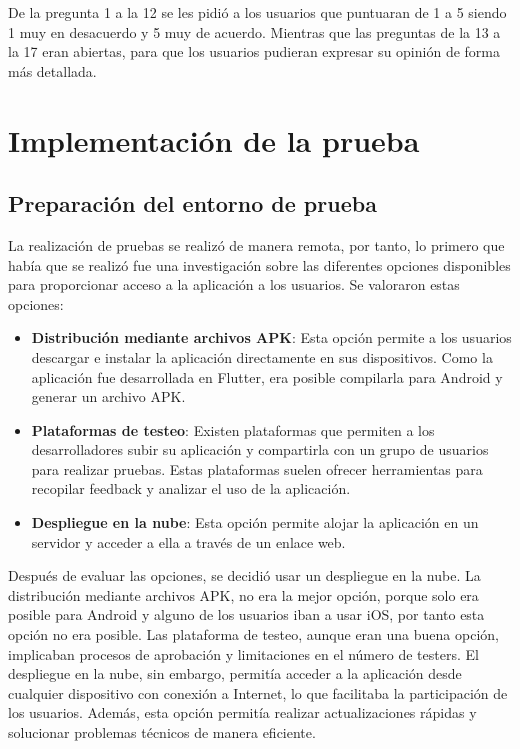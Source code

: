 De la pregunta 1 a la 12 se les pidió a los usuarios que puntuaran de 1 a 5 siendo 1 muy en desacuerdo y 5 muy de acuerdo. Mientras que 
las preguntas de la 13 a la 17 eran abiertas, para que los usuarios pudieran expresar su opinión de forma más detallada.

\newpage

\section{Implementación de la prueba}

\subsection{Preparación del entorno de prueba}

La realización de pruebas se realizó de manera remota, por tanto, lo primero que había que se realizó  fue una investigación sobre las diferentes opciones disponibles para proporcionar acceso a la aplicación a los usuarios. Se valoraron estas opciones: 

\begin{itemize}
    \item \textbf{Distribución mediante archivos APK}: Esta opción permite a los usuarios descargar e instalar la aplicación directamente en sus dispositivos. Como la aplicación fue desarrollada en Flutter, era posible compilarla para Android y generar un archivo APK. \cite{keepcodingAPK}
    \item \textbf{Plataformas de testeo}: Existen plataformas que permiten a los desarrolladores subir su aplicación y compartirla con un grupo de usuarios para realizar pruebas. Estas plataformas suelen ofrecer herramientas para recopilar feedback y analizar el uso de la aplicación. \cite{instabug2024}
    \item \textbf{Despliegue en la nube}: Esta opción permite alojar la aplicación en un servidor y acceder a ella a través de un enlace web. \cite{seidorCloudApp2023}
\end{itemize}


Después de evaluar las opciones, se decidió usar un despliegue en la nube. La distribución mediante archivos APK, no era la mejor opción, porque solo era posible para Android y alguno de los usuarios iban a usar iOS, por tanto esta opción no era posible.
Las plataforma de testeo, aunque eran una buena opción, implicaban procesos de aprobación y limitaciones en el número de testers. 
El despliegue en la nube, sin embargo, permitía acceder a la aplicación desde cualquier dispositivo con conexión a Internet, lo que facilitaba la participación de los usuarios. Además, esta opción permitía realizar actualizaciones rápidas y solucionar problemas técnicos de manera eficiente. 

